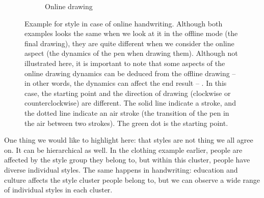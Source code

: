 \begin{figure}[!htbp]
    \begin{subfigure}[tb]{0.45\textwidth}
        \caption{Online drawing}
    \end{subfigure}
    \caption{Example for style in case of online handwriting. Although both examples looks the same when we look at it in the offline mode (the final drawing), they are quite different when we consider the online aspect (the dynamics of the pen when drawing them). Although not illustrated here, it is important to note that some aspects of the online drawing dynamics can be deduced from the offline drawing -- in other words, the dynamics can affect the end result -- \citep{diaz2017recovering}. In this case, the starting point and the direction of drawing (clockwise or counterclockwise) are different. The solid line indicate a stroke, and the dotted line indicate an air stroke (the transition of the pen in the air between two strokes). The green dot is the starting point.}
    \label{fig:online_handwriting_styles}
  \end{figure}

  \par One thing we would like to highlight here: that styles are not thing we all agree on. It can be hierarchical as well. In the clothing example earlier, people are affected by the style group they belong to, but within this cluster, people have diverse individual styles. The same happens in handwriting: education and culture affects the style cluster people belong to, but we can observe a wide range of individual styles in each cluster.


